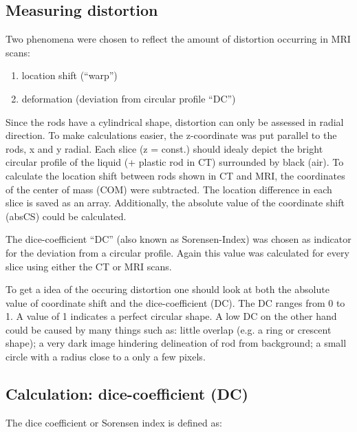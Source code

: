 \subsection{Measuring distortion}

Two phenomena were chosen to reflect the amount of distortion occurring in MRI scans:

\begin{enumerate}[label=\textbf{\arabic*)}]
 \item location shift (``warp'')
 \item deformation (deviation from circular profile ``DC'')
\end{enumerate}

Since the rods have a cylindrical shape, distortion can only be assessed in radial direction. To make calculations easier, the z-coordinate was put parallel to the rods, x and y radial.
Each slice (z = const.) should idealy depict the bright circular profile of the liquid (+ plastic rod in CT) surrounded by black (air).
To calculate the location shift between rods shown in CT and MRI, the coordinates of the center of mass (COM) were subtracted.
The location difference in each slice is saved as an array. Additionally, the absolute value of the coordinate shift (absCS) could be calculated.


The dice-coefficient ``DC'' (also known as Sorensen-Index) was chosen as indicator for the deviation from a circular profile. Again this value was calculated for every slice using either the CT or MRI scans.

To get a idea of the occuring distortion one should look at both the absolute value of coordinate shift and the dice-coefficient (DC).
The DC ranges from 0 to 1. A value of 1 indicates a perfect circular shape. A low DC on the other hand could be caused by many things such as:
little overlap (e.g. a ring or crescent shape); a very dark image hindering delineation of rod from background; a small circle with a radius close to a only a few pixels.



\subsection{Calculation: dice-coefficient (DC)}

The dice coefficient or Sorensen index \cite{MedPy_dc-doc} is defined as:

